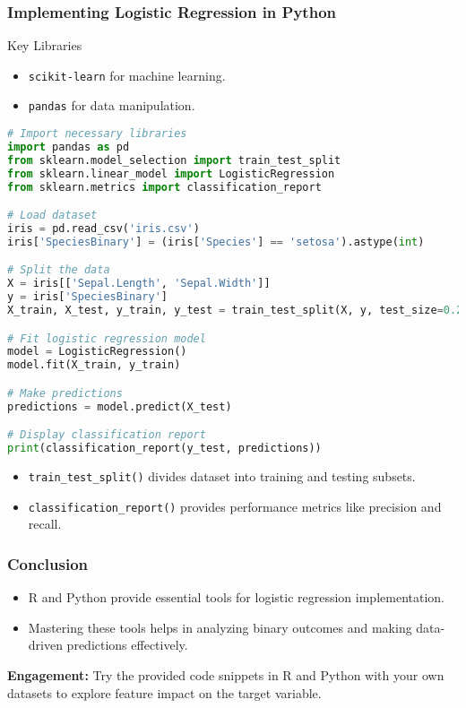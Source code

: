 \documentclass[aspectratio=169]{beamer}
\begin{document}
\begin{frame}[fragile]
    \frametitle{Implementing Logistic Regression in Python}
    \begin{block}{Key Libraries}
        \begin{itemize}
            \item \texttt{scikit-learn} for machine learning.
            \item \texttt{pandas} for data manipulation.
        \end{itemize}
    \end{block}
    
    \begin{lstlisting}[language=Python]
# Import necessary libraries
import pandas as pd
from sklearn.model_selection import train_test_split
from sklearn.linear_model import LogisticRegression
from sklearn.metrics import classification_report

# Load dataset
iris = pd.read_csv('iris.csv')
iris['SpeciesBinary'] = (iris['Species'] == 'setosa').astype(int)

# Split the data
X = iris[['Sepal.Length', 'Sepal.Width']]
y = iris['SpeciesBinary']
X_train, X_test, y_train, y_test = train_test_split(X, y, test_size=0.2, random_state=0)

# Fit logistic regression model
model = LogisticRegression()
model.fit(X_train, y_train)

# Make predictions
predictions = model.predict(X_test)

# Display classification report
print(classification_report(y_test, predictions))
    \end{lstlisting}
    
    \begin{itemize}
        \item \texttt{train\_test\_split()} divides dataset into training and testing subsets.
        \item \texttt{classification\_report()} provides performance metrics like precision and recall.
    \end{itemize}
\end{frame}

\begin{frame}
    \frametitle{Conclusion}
    \begin{itemize}
        \item R and Python provide essential tools for logistic regression implementation.
        \item Mastering these tools helps in analyzing binary outcomes and making data-driven predictions effectively.
    \end{itemize}
    \textbf{Engagement:} Try the provided code snippets in R and Python with your own datasets to explore feature impact on the target variable.
\end{frame}
\end{document}
